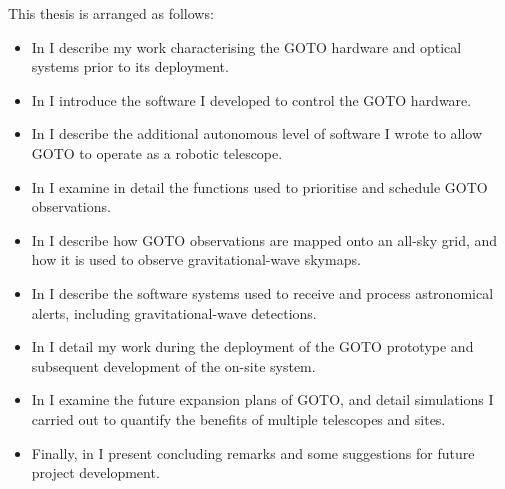 \begin{colsection}
This thesis is arranged as follows:
%
\begin{itemize}
    \item In  I describe my work characterising the GOTO hardware and optical systems prior to its deployment.
    \item In  I introduce the software I developed to control the GOTO hardware.
    \item In  I describe the additional autonomous level of software I wrote to allow GOTO to operate as a robotic telescope.
    \item In  I examine in detail the functions used to prioritise and schedule GOTO observations.
    \item In  I describe how GOTO observations are mapped onto an all-sky grid, and how it is used to observe gravitational-wave skymaps.
    \item In  I describe the software systems used to receive and process astronomical alerts, including gravitational-wave detections.
    \item In  I detail my work during the deployment of the GOTO prototype and subsequent development of the on-site system.
    \item In  I examine the future expansion plans of GOTO, and detail simulations I carried out to quantify the benefits of multiple telescopes and sites.
    \item Finally, in  I present concluding remarks and some suggestions for future project development.
\end{itemize}

\end{colsection}

